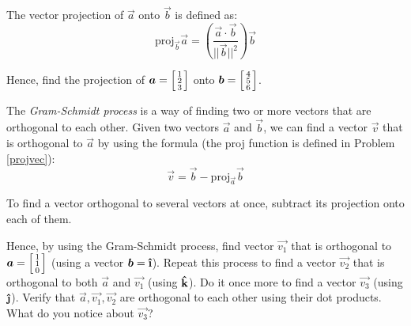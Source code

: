 \begin{problem}[1]
  The vector projection of \(\vec{a}\) onto \(\vec{b}\) is defined as:
  \begin{equation}
    \text{proj}_{\vec{b}}\vec{a} = \left(\frac{\vec{a}\cdot\vec{b}}{||\vec{b}||^2}\right)\vec{b}
  \end{equation}


  Hence, find the projection of \(\vec{a}=\begin{bsmallmatrix}
    1 \\
    2 \\
    3
  \end{bsmallmatrix}\) onto \(\vec{b}=\begin{bsmallmatrix}
    4 \\
    5 \\
    6
  \end{bsmallmatrix}\).
  \label{projvec}
\end{problem}
\begin{problem}[1]
  The \emph{Gram-Schmidt process} is a way of finding two or more vectors that are orthogonal to each other. Given two vectors \(\vec{a}\) and \(\vec{b}\), we can find a vector \(\vec{v}\) that is orthogonal to \(\vec{a}\) by using the formula (the proj function is defined in Problem \ref{projvec}):
  \begin{equation}
    \vec{v} = \vec{b} - \text{proj}_{\vec{a}}\vec{b}
  \end{equation}


  To find a vector orthogonal to several vectors at once, subtract its projection onto each of them.


  Hence, by using the Gram-Schmidt process, find  vector \(\vec{v_1}\) that is orthogonal to \(\vec{a}=\begin{bsmallmatrix}
    1 \\
    1 \\
    0
  \end{bsmallmatrix}\) (using a vector \(\vec{b}=\ihat\)). Repeat this process to find a vector \(\vec{v_2}\) that is orthogonal to both \(\vec{a}\) and \(\vec{v_1}\) (using \(\boldsymbol{\hat{\textbf{k}}}\)). Do it once more to find a vector \(\vec{v_3}\) (using \(\jhat\)). Verify that \(\vec{a}, \vec{v_1}, \vec{v_2}\) are orthogonal to each other using their dot products. What do you notice about \(\vec{v_3}\)?
\end{problem}
%

